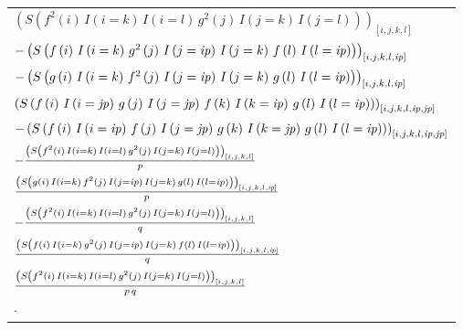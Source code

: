 \documentclass[12pt]{article}
\begin{document}
 \begin{longtable}{l}
$\left(S\left(f^2\left(i\right)\,I\left(i=k\right)\,I\left(i=l
 \right)\,g^2\left(j\right)\,I\left(j=k\right)\,I\left(j=l\right)
 \right)\right)_{\left[ i , j , k , l \right] }$
\\
$-\left(S\left(f\left(i\right)\,I\left(i=k\right)\,g^2\left(j\right)
 \,I\left(j={\it ip}\right)\,I\left(j=k\right)\,f\left(l\right)\,I
 \left(l={\it ip}\right)\right)\right)_{\left[ i , j , k , l ,
 {\it ip} \right] }$
\\
$-\left(S\left(g\left(i\right)\,I\left(i=k\right)\,f^2\left(j\right)
 \,I\left(j={\it ip}\right)\,I\left(j=k\right)\,g\left(l\right)\,I
 \left(l={\it ip}\right)\right)\right)_{\left[ i , j , k , l ,
 {\it ip} \right] }$
\\
$\left(S\left(f\left(i\right)\,I\left(i={\it jp}\right)\,g\left(j
 \right)\,I\left(j={\it jp}\right)\,f\left(k\right)\,I\left(k=
 {\it ip}\right)\,g\left(l\right)\,I\left(l={\it ip}\right)\right)
 \right)_{\left[ i , j , k , l , {\it ip} , {\it jp} \right] }$
\\
$-\left(S\left(f\left(i\right)\,I\left(i={\it ip}\right)\,f\left(j
 \right)\,I\left(j={\it jp}\right)\,g\left(k\right)\,I\left(k=
 {\it jp}\right)\,g\left(l\right)\,I\left(l={\it ip}\right)\right)
 \right)_{\left[ i , j , k , l , {\it ip} , {\it jp} \right] }$
\\
$-{{\left(S\left(f^2\left(i\right)\,I\left(i=k\right)\,I\left(i=l
 \right)\,g^2\left(j\right)\,I\left(j=k\right)\,I\left(j=l\right)
 \right)\right)_{\left[ i , j , k , l \right] }}\over{p}}$
\\
${{\left(S\left(g\left(i\right)\,I\left(i=k\right)\,f^2\left(j
 \right)\,I\left(j={\it ip}\right)\,I\left(j=k\right)\,g\left(l
 \right)\,I\left(l={\it ip}\right)\right)\right)_{\left[ i , j , k ,
 l , {\it ip} \right] }}\over{p}}$
\\
$-{{\left(S\left(f^2\left(i\right)\,I\left(i=k\right)\,I\left(i=l
 \right)\,g^2\left(j\right)\,I\left(j=k\right)\,I\left(j=l\right)
 \right)\right)_{\left[ i , j , k , l \right] }}\over{q}}$
\\
${{\left(S\left(f\left(i\right)\,I\left(i=k\right)\,g^2\left(j
 \right)\,I\left(j={\it ip}\right)\,I\left(j=k\right)\,f\left(l
 \right)\,I\left(l={\it ip}\right)\right)\right)_{\left[ i , j , k ,
 l , {\it ip} \right] }}\over{q}}$
\\
${{\left(S\left(f^2\left(i\right)\,I\left(i=k\right)\,I\left(i=l
 \right)\,g^2\left(j\right)\,I\left(j=k\right)\,I\left(j=l\right)
 \right)\right)_{\left[ i , j , k , l \right] }}\over{p\,q}}$
\\
$\cdot$
\end{longtable}
\end{document}
